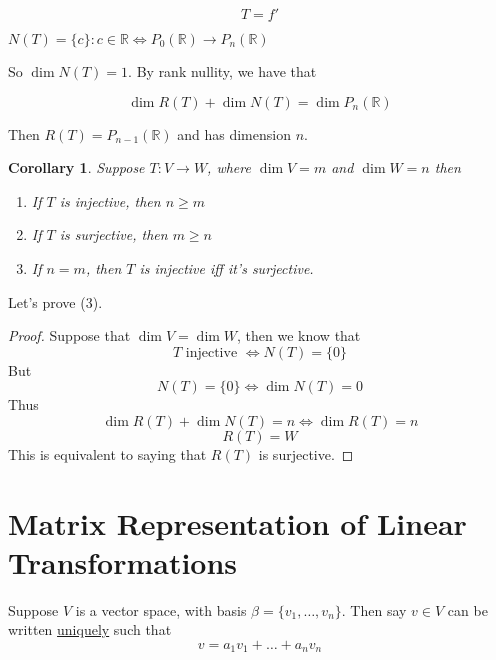 \documentclass{article}
\newtheorem{corollary}[theorem]{Corollary}
\newtheorem{one minute paper}[theorem]{One Minute Paper}
\begin{document}
\begin{equation}
    T = f'
\end{equation}

$N(T) = \{c\}: c \in \mathbb{R} \iff P_0(\mathbb{R}) \rightarrow P_n(\mathbb{R})$

So $\dim N(T) = 1$. By rank nullity, we have that 

\begin{equation}
    \dim R(T) + \dim N(T) = \dim P_n(\mathbb{R})
\end{equation}

Then $R(T) = P_{n-1}(\mathbb{R})$ and has dimension $n$. 

\begin{corollary}
    Suppose $T: V \rightarrow W$, where $\dim V = m$ and $\dim W = n$ then 
    \begin{enumerate}
        \item If $T$ is injective, then $n \geq m$
        \item If $T$ is surjective, then $m \geq n$
        \item If $n = m$, then $T$ is injective iff it's surjective. 
    \end{enumerate}
\end{corollary}

Let's prove (3).

\begin{proof}
    Suppose that $\dim V = \dim W$, then we know that 
    \begin{equation}
        T \text{ injective } \iff N(T) = \{0\}
    \end{equation}
    But 
    \begin{equation}
        N(T) = \{0\} \iff \dim N(T) = 0
    \end{equation}
    Thus 
    \begin{equation}
        \dim R(T) + \dim N(T) = n \iff \dim R(T) = n
    \end{equation}
    \begin{equation}
        R(T) = W
    \end{equation}
    This is equivalent to saying that $R(T)$ is surjective. 
\end{proof}

\section*{Matrix Representation of Linear Transformations}

Suppose $V$ is a vector space, with basis $\beta = \{v_1, \dots, v_n\}$. Then say $v \in V$ can be written \underline{uniquely} such that 
\begin{equation}
    v = a_1v_1 + \dots + a_nv_n
\end{equation}
\end{document}
